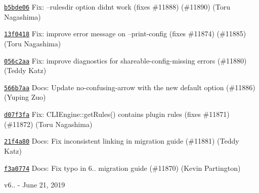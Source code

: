\begin{DoxyItemize}
\item \href{https://github.com/eslint/eslint/commit/b5bde0669bd6a7a6b8e38cdf204d8d4b932cea63}{\texttt{ {\ttfamily b5bde06}}} Fix\+: --rulesdir option didn\textquotesingle{}t work (fixes \#11888) (\#11890) (Toru Nagashima)
\item \href{https://github.com/eslint/eslint/commit/13f041897ee31982808a57b4d06450b57c9b27dc}{\texttt{ {\ttfamily 13f0418}}} Fix\+: improve error message on --print-\/config (fixes \#11874) (\#11885) (Toru Nagashima)
\item \href{https://github.com/eslint/eslint/commit/056c2aaf39a5f8d06de24f06946dda95032a0361}{\texttt{ {\ttfamily 056c2aa}}} Fix\+: improve diagnostics for shareable-\/config-\/missing errors (\#11880) (Teddy Katz)
\item \href{https://github.com/eslint/eslint/commit/566b7aa5d61fb31cd47fe4da7820b07cf9bde1ec}{\texttt{ {\ttfamily 566b7aa}}} Docs\+: Update no-\/confusing-\/arrow with the new default option (\#11886) (Yuping Zuo)
\item \href{https://github.com/eslint/eslint/commit/d07f3fae19b901c30cf4998f10722cb3182bd237}{\texttt{ {\ttfamily d07f3fa}}} Fix\+: CLIEngine\+::get\+Rules() contains plugin rules (fixes \#11871) (\#11872) (Toru Nagashima)
\item \href{https://github.com/eslint/eslint/commit/21f4a8057ccc941f72bb617ae3b5c135a774f6c0}{\texttt{ {\ttfamily 21f4a80}}} Docs\+: Fix inconsistent linking in migration guide (\#11881) (Teddy Katz)
\item \href{https://github.com/eslint/eslint/commit/f3a0774a8879b08777a4aedc76677f13d5156242}{\texttt{ {\ttfamily f3a0774}}} Docs\+: Fix typo in 6.. migration guide (\#11870) (Kevin Partington)
\end{DoxyItemize}

v6.. -\/ June 21, 2019


